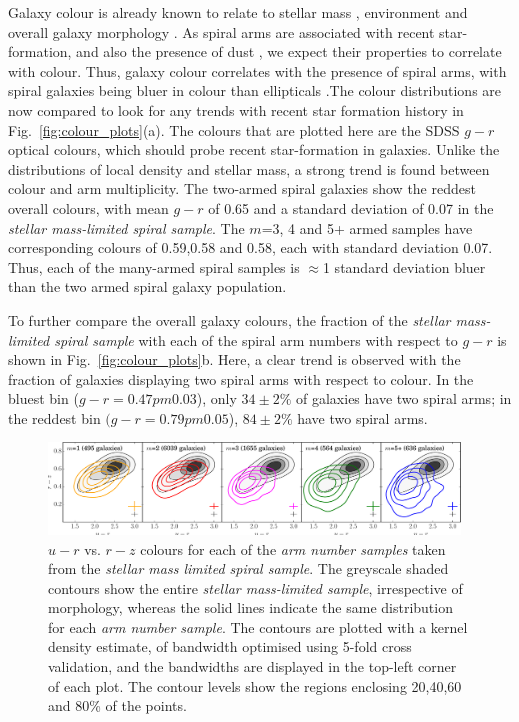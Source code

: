 \documentclass[useAMS,usenatbib]{mn2e}
\begin{document}
Galaxy colour is already known to relate to stellar mass \citep{Baldry_06}, environment \citep{Baldry_04} and overall galaxy morphology \citep{Bamford_09}. As spiral arms are associated with recent star-formation, and also the presence of dust \citep{Grosbol_12}, we expect their properties to correlate with colour. Thus, galaxy colour correlates with the presence of spiral arms, with spiral galaxies being bluer in colour than ellipticals \citep{Bamford_09,Schawinski_14}.The colour distributions are now compared to look for any trends with recent star formation history in Fig.~\ref{fig:colour_plots}(a). The colours that are plotted here are the SDSS $g-r$ optical colours, which should probe recent star-formation in galaxies. Unlike the distributions of local density and stellar mass, a strong trend is found between colour and arm multiplicity. The two-armed spiral galaxies show the reddest overall colours, with mean $g-r$ of 0.65 and a standard deviation of 0.07 in the \textit{stellar mass-limited spiral sample}. The $m$=3, 4 and 5+ armed samples have corresponding colours of 0.59,0.58 and 0.58, each with standard deviation 0.07. Thus, each of the many-armed spiral samples is $\approx$1 standard deviation bluer than the two armed spiral galaxy population.

To further compare the overall galaxy colours, the fraction of the \textit{stellar mass-limited spiral sample} with each of the spiral arm numbers with respect to $g-r$ is shown in Fig.~\ref{fig:colour_plots}b. Here, a clear trend is observed with the fraction of galaxies displaying two spiral arms with respect to colour. In the bluest bin ($g-r=0.47 pm 0.03$), only $34\pm2\%$ of galaxies have two spiral arms; in the reddest bin $(g-r=0.79 pm 0.05$), $84\pm2\%$ have two spiral arms.

\begin{figure}
		\centering

        \includegraphics[width=0.975\textwidth]{Images/Results/cc1.pdf}

        \caption{$u-r$ vs. $r-z$ colours for each of the \textit{arm number samples} taken from the \textit{stellar mass limited spiral sample}. The greyscale shaded contours show the entire \textit{stellar mass-limited sample}, irrespective of morphology, whereas the solid lines indicate the same distribution for each \textit{arm number sample}. The contours are plotted with a kernel density estimate, of bandwidth optimised using 5-fold cross validation, and the bandwidths are displayed in the top-left corner of each plot. The contour levels show the regions enclosing 20,40,60 and 80\% of the points.}

        \label{fig:colour-colour}

\end{figure}
\end{document}
